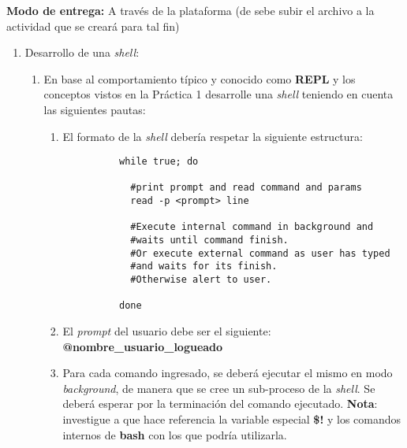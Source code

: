 \textbf{Modo de entrega:} A través de la plataforma (de sebe subir el archivo a la actividad que se creará para tal fin)

\renewcommand{\labelenumiii}{\roman{enumiii})}

\begin{enumerate}
 \item Desarrollo de una \textit{shell}:
      \begin{enumerate}
	    \item En base al comportamiento típico y conocido como \textbf{REPL} y los conceptos vistos en la Práctica 1 desarrolle una \textit{shell} teniendo en cuenta las siguientes pautas:
	    \begin{enumerate}
	      \item El formato de la \textit{shell} debería respetar la siguiente estructura: 
	      \begin{lstlisting}
		  while true; do
		  
		    #print prompt and read command and params
			read -p <prompt> line		    

		    #Execute internal command in background and 
		    #waits until command finish.
		    #Or execute external command as user has typed
		    #and waits for its finish.
		    #Otherwise alert to user.
		    
		  done
	      \end{lstlisting}
	      
	      \item El \textit{prompt} del usuario debe ser el siguiente: \textbf{@nombre\_usuario\_logueado}
	      
	      \item Para cada comando ingresado, se deberá ejecutar el mismo en modo \textit{background}, de manera que se cree un sub-proceso de la \textit{shell}. Se deberá esperar por la terminación del comando ejecutado. \textbf{Nota}: investigue a que hace referencia la variable especial \textbf{\$!} y los comandos internos de \textbf{bash} con los que podría utilizarla. 
	    \end{enumerate}
	    

\end{enumerate}
\end{enumerate}
